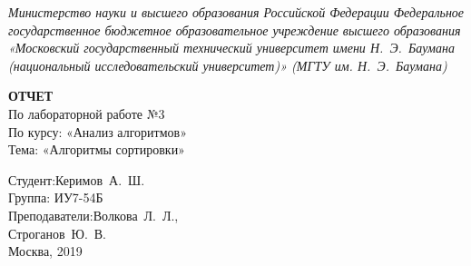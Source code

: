 \begin{titlepage}
	\centering

	{\footnotesize\itshape Министерство науки и высшего образования
	Российской Федерации Федеральное государственное бюджетное
	образовательное учреждение высшего образования «Московский
	государственный технический университет имени Н.~Э.~Баумана
	(национальный исследовательский университет)» (МГТУ им. Н.~Э.~Баумана)
	\\}

	\vspace{60mm}

	\textbf{ОТЧЕТ}\\
	По лабораторной работе №3\\
	По курсу: «Анализ алгоритмов»\\
	Тема: «Алгоритмы сортировки»\\

	\vspace{60mm}

	\hspace{70mm} Студент:\hfill Керимов~А.~Ш.\\
	\hspace{70mm} Группа: \hfill ИУ7-54Б\\
	\hspace{70mm} Преподаватели:\hfill Волкова~Л.~Л.,\\
	                            \hfill Строганов~Ю.~В.\\

	\vfill
	Москва, 2019
\end{titlepage}
